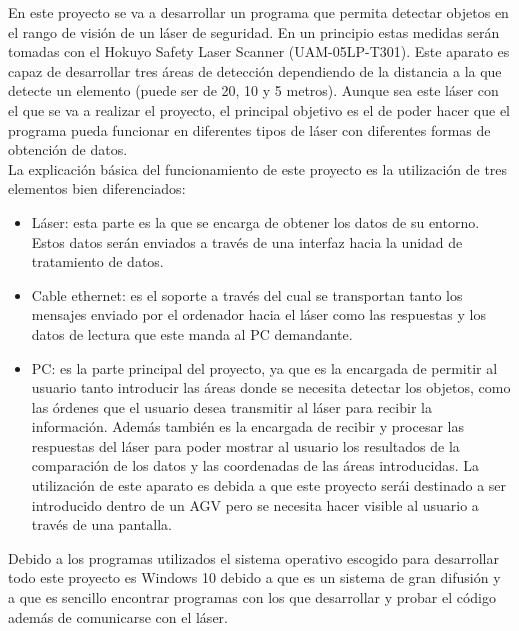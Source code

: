 
En este proyecto se va a desarrollar un programa que permita detectar objetos en el rango de visión de un láser de seguridad. En un principio estas medidas serán tomadas con el Hokuyo Safety Laser Scanner (UAM-05LP-T301). Este aparato es capaz de desarrollar tres áreas de detección dependiendo de la distancia a la que detecte un elemento (puede ser de 20, 10 y 5 metros). Aunque sea este láser con el que se va a realizar el proyecto, el principal objetivo es el de poder hacer que el programa pueda funcionar en diferentes tipos de láser con diferentes formas de obtención de datos.\\
La explicación básica del funcionamiento de este proyecto es la utilización de tres elementos bien diferenciados:
\begin{itemize}
    \item Láser: esta parte es la que se encarga de obtener los datos de su entorno. Estos datos serán enviados a través de una interfaz hacia la unidad de tratamiento de datos.
    \item Cable ethernet: es el soporte a través del cual se transportan tanto los mensajes enviado por el ordenador hacia el láser como las respuestas y los datos de lectura que este manda al PC demandante.
    \item PC: es la parte principal del proyecto, ya que es la encargada de permitir al usuario tanto introducir las áreas donde se necesita detectar los objetos, como las órdenes que el usuario desea transmitir al láser para recibir la información. Además también es la encargada de recibir y procesar las respuestas del láser para poder mostrar al usuario los resultados de la comparación de los datos y las coordenadas de las áreas introducidas. La utilización de este aparato es debida a que este proyecto serái destinado a ser introducido dentro de un AGV pero se necesita hacer visible al usuario a través de una pantalla.\\
\end{itemize}
Debido a los programas utilizados el sistema operativo escogido para desarrollar todo este proyecto es Windows 10 debido a que es un sistema de gran difusión y a que es sencillo encontrar programas con los que desarrollar y probar el código además de comunicarse con el láser.\\
